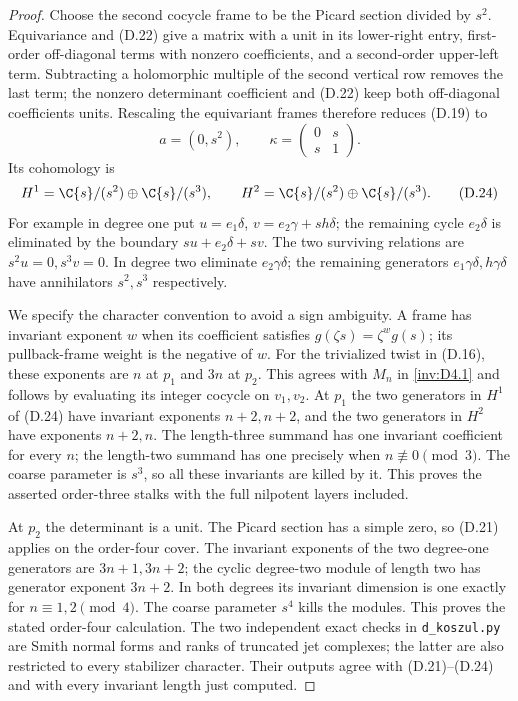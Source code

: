 \begin{proof}
Choose the second cocycle frame to be the Picard section divided by
$s^2$. Equivariance and (D.22) give a matrix with a unit in its
lower-right entry, first-order off-diagonal terms with nonzero
coefficients, and a second-order upper-left term. Subtracting a
holomorphic multiple of the second vertical row removes the last
term; the nonzero determinant coefficient and (D.22) keep both
off-diagonal coefficients units. Rescaling the equivariant frames
therefore reduces (D.19) to
\[
 a=(0,s^2),\qquad \kappa=\begin{pmatrix}0&s\\s&1\end{pmatrix}. \tag{D.23}
\]
Its cohomology is
\[
 H^1=\C\{s\}/(s^2)\oplus\C\{s\}/(s^3),\qquad
 H^2=\C\{s\}/(s^2)\oplus\C\{s\}/(s^3).             \tag{D.24}
\]
For example in degree one put
$u=e_1\delta$, $v=e_2\gamma+s h\delta$; the remaining cycle
$e_2\delta$ is eliminated by the boundary
$s u+e_2\delta+s v$. The two surviving relations are
$s^2u=0,s^3v=0$. In degree two eliminate $e_2\gamma\delta$;
the remaining generators $e_1\gamma\delta,h\gamma\delta$
have annihilators $s^2,s^3$ respectively.

We specify the character convention to avoid a sign ambiguity.
A frame has invariant exponent $w$ when its coefficient satisfies
$g(\zeta s)=\zeta^w g(s)$; its pullback-frame weight is the negative
of $w$. For the trivialized twist in (D.16), these exponents are
$n$ at $p_1$ and $3n$ at $p_2$. This agrees with $M_n$ in \ref{inv:D4.1}
and follows by evaluating its integer cocycle on $v_1,v_2$.
At $p_1$ the two generators in $H^1$ of (D.24) have invariant
exponents $n+2,n+2$, and the two generators in $H^2$ have exponents
$n+2,n$. The length-three summand has one invariant coefficient
for every $n$; the length-two summand has one precisely when
$n\not\equiv0\pmod3$. The coarse parameter is $s^3$, so all these
invariants are killed by it. This proves the asserted order-three
stalks with the full nilpotent layers included.

At $p_2$ the determinant is a unit. The Picard section has a simple
zero, so (D.21) applies on the order-four cover. The invariant
exponents of the two degree-one generators are $3n+1,3n+2$;
the cyclic degree-two module of length two has generator exponent
$3n+2$. In both degrees its invariant dimension is one exactly for
$n\equiv1,2\pmod4$. The coarse parameter $s^4$ kills the modules.
This proves the stated order-four calculation. The two independent
exact checks in \texttt{d\_koszul.py} are Smith normal forms and
ranks of truncated jet complexes; the latter are also restricted to
every stabilizer character. Their outputs agree with (D.21)--(D.24)
and with every invariant length just computed.
\end{proof}

